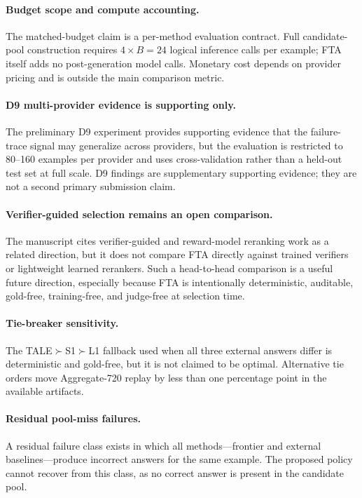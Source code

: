 \documentclass[smallcondensed]{svjour3}
\begin{document}
\paragraph{Budget scope and compute accounting.}
The matched-budget claim is a per-method evaluation contract.
Full candidate-pool construction requires $4 \times B = 24$ logical inference
calls per example; FTA itself adds no post-generation model calls.
Monetary cost depends on provider pricing and is outside the main comparison
metric.

\paragraph{D9 multi-provider evidence is supporting only.}
The preliminary D9 experiment provides supporting evidence that the
failure-trace signal may generalize across providers, but the evaluation is
restricted to 80--160 examples per provider and uses cross-validation rather
than a held-out test set at full scale.
D9 findings are supplementary supporting evidence; they are not a second primary
submission claim.

\paragraph{Verifier-guided selection remains an open comparison.}
The manuscript cites verifier-guided and reward-model reranking work as a
related direction, but it does not compare FTA directly against trained
verifiers or lightweight learned rerankers. Such a head-to-head comparison is a
useful future direction, especially because FTA is intentionally deterministic,
auditable, gold-free, training-free, and judge-free at selection time.

\paragraph{Tie-breaker sensitivity.}
The TALE$\succ$S1$\succ$L1 fallback used when all three external answers
differ is deterministic and gold-free, but it is not claimed to be optimal.
Alternative tie orders move Aggregate-720 replay by less than one percentage
point in the available artifacts.

\paragraph{Residual pool-miss failures.}
A residual failure class exists in which all methods---frontier and external
baselines---produce incorrect answers for the same example.
The proposed policy cannot recover from this class, as no correct answer is
present in the candidate pool.
\end{document}
